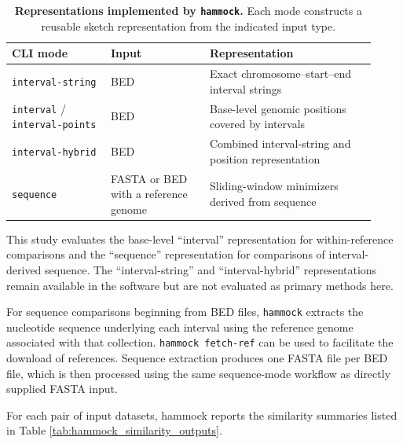 \documentclass[11pt]{article}
\newcommand{\program}[1]{\texttt{#1}}
\begin{document}
\begin{table}[htbp]
\centering
\caption{\textbf{Representations implemented by \program{hammock}.}
Each mode constructs a reusable sketch representation from the indicated
input type.}
\label{tab:hammock_modes}
\begin{tabular}{>{\raggedright\arraybackslash}p{0.25\linewidth}
                >{\raggedright\arraybackslash}p{0.25\linewidth}
                >{\raggedright\arraybackslash}p{0.42\linewidth}}
\toprule
\textbf{CLI mode} & \textbf{Input} & \textbf{Representation} \\
\midrule
\texttt{interval-string}
& BED
& Exact chromosome--start--end interval strings \\

\texttt{interval} / \texttt{interval-points}
& BED
& Base-level genomic positions covered by intervals \\

\texttt{interval-hybrid}
& BED
& Combined interval-string and position representation \\

\texttt{sequence}
& FASTA or BED with a reference genome
& Sliding-window minimizers derived from sequence \\
\bottomrule
\end{tabular}
\end{table}

This study evaluates the base-level ``interval'' representation for within-reference comparisons and the ``sequence'' representation for comparisons of interval-derived sequence. The ``interval-string'' and ``interval-hybrid'' representations remain available in the software but are not evaluated as primary methods here.

For sequence comparisons beginning from BED files, \program{hammock} extracts the nucleotide sequence underlying each interval using the reference genome associated with that collection. \texttt{hammock fetch-ref} can be used to facilitate the download of references. Sequence extraction produces one FASTA file per BED file, which is then processed using the same sequence-mode workflow as directly supplied FASTA input.

For each pair of input datasets, hammock reports the similarity summaries listed in Table \ref{tab:hammock_similarity_outputs}.
\end{document}
